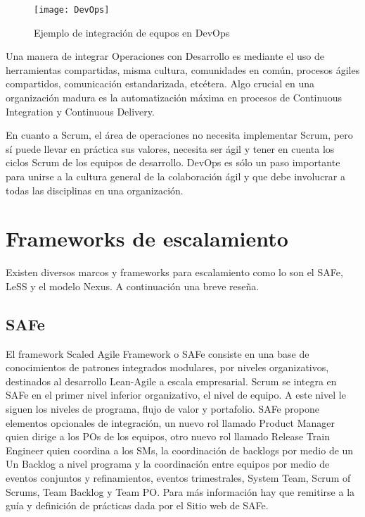 \begin{figure}[h]
  \centering
  \texttt{[image: DevOps]}
  \caption{Ejemplo de integración de equpos en DevOps}
  \centering
  \label{fig:DevOps} %
\end{figure}

Una manera de integrar Operaciones con Desarrollo es mediante el uso de herramientas compartidas, misma cultura, comunidades en común, procesos ágiles compartidos, comunicación estandarizada, etcétera. Algo crucial en una organización madura es la automatización máxima en procesos de Continuous Integration y Continuous Delivery.

En cuanto a Scrum, el área de operaciones no necesita implementar Scrum, pero sí puede llevar en práctica sus valores, necesita ser ágil y tener en cuenta los ciclos Scrum de los equipos de desarrollo. DevOps es sólo un paso importante para unirse a la cultura general de la colaboración ágil y que debe involucrar a todas las disciplinas en una organización. 


\section{Frameworks de escalamiento}

Existen diversos marcos y frameworks para escalamiento como lo son el SAFe, LeSS y el modelo Nexus. A continuación una breve reseña.

\subsection{SAFe}

El framework Scaled Agile Framework o SAFe consiste en una base de conocimientos de patrones integrados modulares, por niveles organizativos, destinados al desarrollo Lean-Agile a escala empresarial. Scrum se integra en SAFe en el primer nivel inferior organizativo, el nivel de equipo. A este nivel le siguen los niveles de programa, flujo de valor y portafolio. SAFe propone elementos opcionales de integración, un nuevo rol llamado Product Manager quien dirige a los POs de los equipos, otro nuevo rol llamado Release Train Engineer quien coordina a los SMs, la coordinación de backlogs por medio de un Un Backlog a nivel programa y la coordinación entre equipos por medio de eventos conjuntos y refinamientos, eventos trimestrales, System Team, Scrum of Scrums, Team Backlog y Team PO. Para más información hay que remitirse a la guía y definición de prácticas dada por el Sitio web de SAFe.

